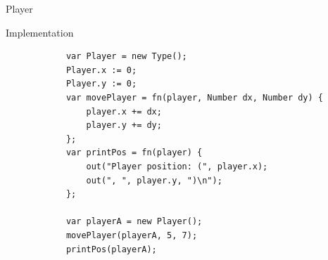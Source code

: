 \documentclass[ucs,9pt]{beamer}
\begin{document}
\begin{frame}[fragile]{Player}
	\begin{block}{Implementation}
		\begin{lstlisting}
			var Player = new Type();
			Player.x := 0;
			Player.y := 0;
			var movePlayer = fn(player, Number dx, Number dy) {
			    player.x += dx;
			    player.y += dy;
			};
			var printPos = fn(player) {
			    out("Player position: (", player.x);
			    out(", ", player.y, ")\n");
			};

			var playerA = new Player();
			movePlayer(playerA, 5, 7);
			printPos(playerA);
		\end{lstlisting}
	\end{block}
\end{frame}

\HNIlastframe
\end{document}
